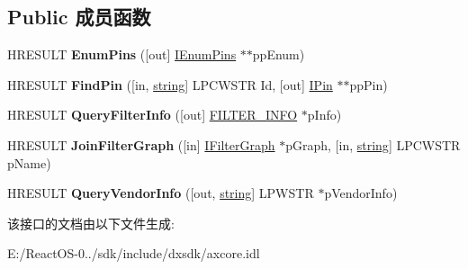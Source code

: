 \subsection*{Public 成员函数}
\begin{DoxyCompactItemize}
\item 
\mbox{\label{interface_i_base_filter_a4ae91d1b205c9d976c5342ed43767e6e}} 
H\+R\+E\+S\+U\+LT {\bfseries Enum\+Pins} (\mbox{[}out\mbox{]} \hyperlink{interface_i_enum_pins}{I\+Enum\+Pins} $\ast$$\ast$pp\+Enum)
\item 
\mbox{\label{interface_i_base_filter_a93f68cf7a936d6c29763c7c734206ab4}} 
H\+R\+E\+S\+U\+LT {\bfseries Find\+Pin} (\mbox{[}in, \hyperlink{structstring}{string}\mbox{]} L\+P\+C\+W\+S\+TR Id, \mbox{[}out\mbox{]} \hyperlink{interface_i_pin}{I\+Pin} $\ast$$\ast$pp\+Pin)
\item 
\mbox{\label{interface_i_base_filter_acb5a2732412c54d7c12dbdbd9afea89d}} 
H\+R\+E\+S\+U\+LT {\bfseries Query\+Filter\+Info} (\mbox{[}out\mbox{]} \hyperlink{struct_i_base_filter_1_1___filter_info}{F\+I\+L\+T\+E\+R\+\_\+\+I\+N\+FO} $\ast$p\+Info)
\item 
\mbox{\label{interface_i_base_filter_aeb36ce8c5a4756e98540a7a904feb615}} 
H\+R\+E\+S\+U\+LT {\bfseries Join\+Filter\+Graph} (\mbox{[}in\mbox{]} \hyperlink{interface_i_filter_graph}{I\+Filter\+Graph} $\ast$p\+Graph, \mbox{[}in, \hyperlink{structstring}{string}\mbox{]} L\+P\+C\+W\+S\+TR p\+Name)
\item 
\mbox{\label{interface_i_base_filter_a932ce0644ef2be98a31b5cae94180446}} 
H\+R\+E\+S\+U\+LT {\bfseries Query\+Vendor\+Info} (\mbox{[}out, \hyperlink{structstring}{string}\mbox{]} L\+P\+W\+S\+TR $\ast$p\+Vendor\+Info)
\end{DoxyCompactItemize}


该接口的文档由以下文件生成\+:\begin{DoxyCompactItemize}
\item 
E\+:/\+React\+O\+S-\/0../sdk/include/dxsdk/axcore.\+idl\end{DoxyCompactItemize}
